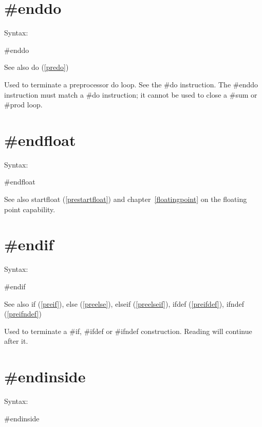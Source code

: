 
\section{\#enddo}
\label{preenddo}

\noindent Syntax:

\#enddo
 
\noindent See also do (\ref{predo})

\noindent Used to terminate a preprocessor 
do loop. See the \#do instruction. The \#enddo 
instruction must match a \#do instruction; it cannot be used to close a
\#sum or \#prod loop.


\section{\#endfloat}
\label{preendfloat}

\noindent Syntax:

\#endfloat

\noindent See also startfloat (\ref{prestartfloat}) and chapter~\ref{floatingpoint} on the floating point capability.
 

\section{\#endif}
\label{preendif}

\noindent Syntax:

\#endif
 
\noindent See also if (\ref{preif}),
            else (\ref{preelse}),
            elseif (\ref{preelseif}),
            ifdef (\ref{preifdef}),
            ifndef (\ref{preifndef})

\noindent Used to terminate a \#if, 
\#ifdef or \#ifndef construction. 
Reading will continue after it.


\section{\#endinside}
\label{preendinside}

\noindent Syntax:

\#endinside
 
